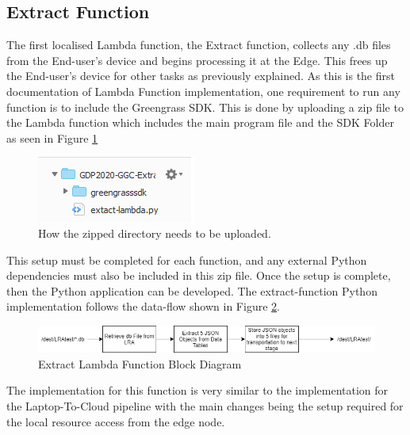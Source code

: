 \subsection{Extract Function}
\label{extract_fn_impl}
The first localised Lambda function, the Extract function, collects any .db files from the End-user's device and begins processing it at the Edge. This frees up the End-user's device for other tasks as previously explained. As this is the first documentation of Lambda Function implementation, one requirement to run any function is to include the Greengrass SDK. This is done by uploading a zip file to the Lambda function which includes the main program file and the SDK Folder as seen in Figure \ref{fig:ggc_sdk_inclusion}
\begin{figure}[ht]
    \centering
    \includegraphics{pages/Chapter4/Chapter 4 Images/LambdaFns/ggc_sdk_inclusion.png}
    \caption{How the zipped  directory needs to be uploaded.}
    \label{fig:ggc_sdk_inclusion}
\end{figure}

This setup must be completed for each function, and any external Python dependencies must also be included in this zip file. Once the setup is complete, then the Python application can be developed. The extract-function Python implementation follows the data-flow shown in Figure \ref{fig:lambda_extract_fn}.

\begin{figure}[ht]
    \centering
    \includegraphics[width=1\linewidth]{pages/Chapter4/Chapter 4 Images/LambdaFns/extract-fn.png}
    \caption{Extract Lambda Function Block Diagram}
    \label{fig:lambda_extract_fn}
\end{figure}

The implementation for this function is very similar to the implementation for the Laptop-To-Cloud pipeline with the main changes being the setup required for the local resource access from the edge node.

